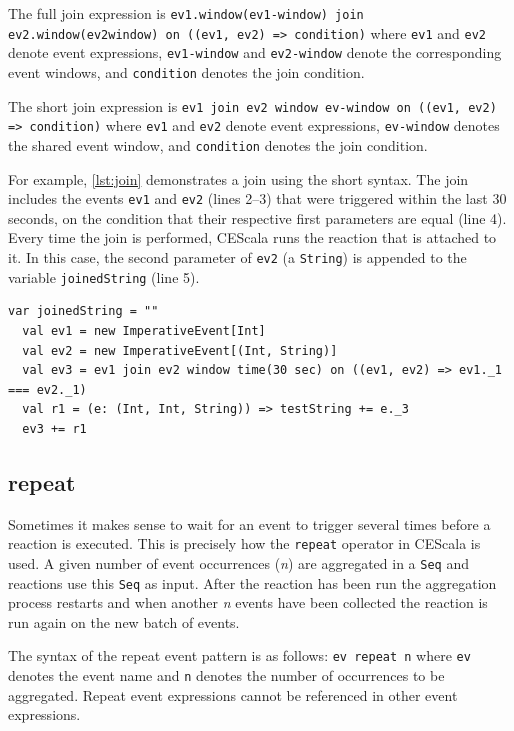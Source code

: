 \documentclass[book,type=bsc,colorback,accentcolor=tud8b,12pt,twoside]{tudthesis}
\begin{document}
The full join expression is \texttt{ev1.window(ev1-window) join ev2.window(ev2\-window) on ((ev1, ev2) => condition)} where \mbox{\texttt{ev1}} and \mbox{\texttt{ev2}} denote event expressions, \mbox{\texttt{ev1-window}} and \mbox{\texttt{ev2-window}} denote the corresponding event windows, and \mbox{\texttt{condition}} denotes the join condition.  

The short join expression is \texttt{ev1 join ev2 window ev-window on ((ev1, ev2) => condition)} where \mbox{\texttt{ev1}} and \mbox{\texttt{ev2}} denote event expressions, \mbox{\texttt{ev-window}} denotes the shared event window, and \mbox{\texttt{condition}} denotes the join condition.  

For example, \autoref{lst:join} demonstrates a join using the short syntax.  The join includes the events \mbox{\texttt{ev1}} and \mbox{\texttt{ev2}} (lines 2--3) that were triggered within the last 30 seconds, on the condition that their respective first parameters are equal (line 4).  Every time the join is performed, CEScala runs the reaction that is attached to it.  In this case, the second parameter of \mbox{\texttt{ev2}} (a \mbox{\texttt{String}}) is appended to the variable \mbox{\texttt{joinedString}} (line 5).  

\begin{lstlisting}[caption=Two events joined on a condition,label=lst:join,float=tp]
  var joinedString = ""
  val ev1 = new ImperativeEvent[Int]
  val ev2 = new ImperativeEvent[(Int, String)]
  val ev3 = ev1 join ev2 window time(30 sec) on ((ev1, ev2) => ev1._1 === ev2._1)
  val r1 = (e: (Int, Int, String)) => testString += e._3
  ev3 += r1
\end{lstlisting}

\subsection{repeat}
\label{sec:repeat}

Sometimes it makes sense to wait for an event to trigger several times before a reaction is executed.  This is precisely how the \mbox{\texttt{repeat}} operator in CEScala is used.  A given number of event occurrences (\emph{n}) are aggregated in a \mbox{\texttt{Seq}} and reactions use this \mbox{\texttt{Seq}} as input.  After the reaction has been run the aggregation process restarts and when another \emph{n} events have been collected the reaction is run again on the new batch of events.  

The syntax of the repeat event pattern is as follows: \mbox{\texttt{ev repeat n}} where \mbox{\texttt{ev}} denotes the event name and \mbox{\texttt{n}} denotes the number of occurrences to be aggregated.  Repeat event expressions cannot be referenced in other event expressions.  
\end{document}
